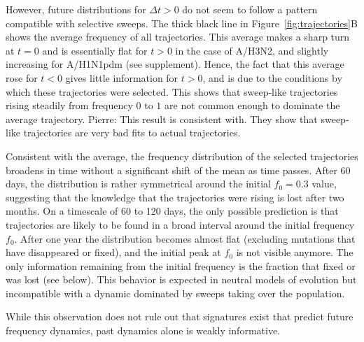 \documentclass[reprint,amsmath,amssymb,superscriptaddress,showpacs,rmp]{revtex4-1}
\newcommand{\pierre}[1]{{\color{red}Pierre: #1}}
\begin{document}
However, future distributions for $\Delta t >0$ do not seem to follow a pattern compatible with selective sweeps.
The thick black line in Figure~\ref{fig:trajectories}B shows the average frequency of all trajectories.
This average makes a sharp turn at $t=0$ and is essentially flat for $t>0$ in the case of A/H3N2, and slightly increasing for A/H1N1pdm (see supplement).
Hence, the fact that this average rose for $t<0$ gives little information for $t>0$, and is due to the conditions by which these trajectories were selected.
This shows that sweep-like trajectories rising steadily from frequency $0$ to $1$ are not common enough to dominate the average trajectory.  \pierre{This result is consistent with\citep{illingworth_components_2012}. They show that sweep-like trajectories are very bad fits to actual trajectories.}

Consistent with the average, the frequency distribution of the selected trajectories broadens in time without a significant shift of the mean as time passes.
After 60 days, the distribution is rather symmetrical around the initial $f_0=0.3$ value, suggesting that the knowledge that the trajectories were rising is lost after two months.
On a timescale of 60 to 120 days, the only possible prediction is that trajectories are likely to be found in a broad interval around the initial frequency $f_0$.
After one year the distribution becomes almost flat (excluding mutations that have disappeared or fixed), and the initial peak at $f_0$ is not visible anymore.
The only information remaining from the initial frequency is the fraction that fixed or was lost (see below).
This behavior is expected in neutral models of evolution \citep{kimura_diffusion_1964} but incompatible with a dynamic dominated by sweeps taking over the population.

While this observation does not rule out that signatures exist that predict future frequency dynamics, past dynamics alone is weakly informative.
\end{document}
